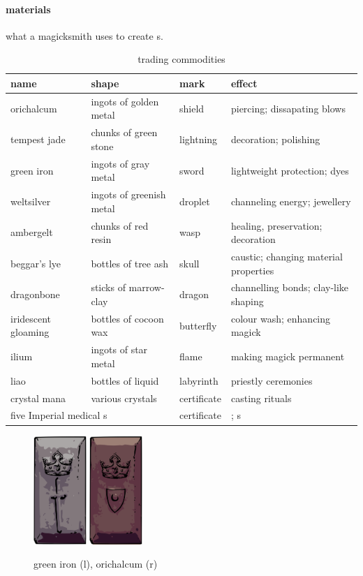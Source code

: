 \paragraph{materials} what a magicksmith uses to create s. \begin{table}\begin{tabular}{p{}p{}p{}p{}}name& shape&mark&effect\\\hline orichalcum&ingots of golden metal & shield& piercing; dissapating blows \\ tempest jade & chunks of green stone & lightning & decoration; polishing \\ green iron & ingots of gray metal & sword & lightweight protection; dyes \\ weltsilver & ingots of greenish metal & droplet & channeling energy; jewellery \\ ambergelt & chunks of red resin & wasp & healing, preservation; decoration \\ beggar's lye & bottles of tree ash & skull & caustic; changing material properties \\ dragonbone & sticks of marrow-clay & dragon & channelling bonds; clay-like shaping \\ iridescent gloaming & bottles of cocoon wax & butterfly & colour wash; enhancing magick \\ ilium & ingots of star metal & flame & making magick permanent \\ liao & bottles of liquid & labyrinth & priestly ceremonies \\ crystal mana & various crystals & certificate & casting rituals \\ \multicolumn{2}{l}{five Imperial medical \s{herb}s} & certificate & \s{medicine}; \s{potion}s \end{tabular}\caption{trading commodities}\end{table} \begin{figure}\centering\includegraphics[width=2cm]{encyclopedia/greeniron} \quad \includegraphics[width=2cm]{encyclopedia/orichalcum}\caption{green iron (l), orichalcum (r)}\end{figure}

